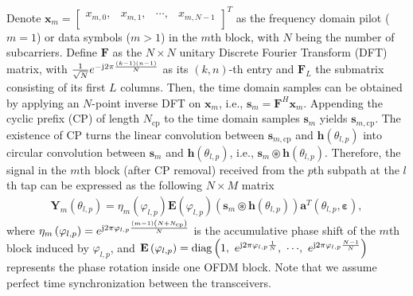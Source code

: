 \documentclass[12pt, draftclsnofoot, onecolumn]{IEEEtran}
\begin{document}
Denote ${{\mathbf{x}}_{m}} \!=\! {{\left[ \begin{matrix}
   {{x}_{m, 0}}, & {{x}_{m, 1}}, & \cdots\!,  & {{x}_{m, N-1}}  \\
\end{matrix} \right]}^{T}}$ as the frequency domain pilot ($m\!=\!1$) or data symbols ($m\!>\!1$) in the $m$th block, with $N$ being the number of subcarriers. Define $\mathbf{F}$ as the $N\!\times\! N$ unitary Discrete Fourier Transform (DFT) matrix, with $\frac{1}{\sqrt{N}}{{e}^{-\text{j}2{\rm\pi} \frac{\left( k-1 \right)\left( n-1 \right)}{N}}}$ as its $(k,n)$-th entry and ${{\mathbf{F}}_{L}}$ the submatrix consisting of its first $L$ columns. Then, the time domain samples can be obtained by applying an $N$-point inverse DFT on ${\mathbf{x}}_{m}$, i.e., ${{\mathbf{s}}_{m}} \!=\! {\mathbf{F}}^H {\mathbf{x}}_{m}$. Appending the cyclic prefix (CP) of length $N_{\mathrm{cp}}$ to the time domain samples ${{\mathbf{s}}_{m}}$ yields ${{\mathbf{s}}_{m, \mathrm{cp}}}$. The existence of CP turns the linear convolution between ${{\mathbf{s}}_{m, \mathrm{cp}}}$ and $\mathbf{h}\left( {{\theta }_{l,p}} \right)$ into circular convolution between ${{\mathbf{s}}_{m}}$ and $\mathbf{h}\left( {{\theta }_{l,p}} \right)$, i.e., $\mathbf{s}_m \circledast \mathbf{h}(\theta_{l,p})$.
Therefore, the signal in the $m$th block (after CP removal) received from the $p$th subpath at the $l$th tap can be expressed as the following $N\times M$ matrix
\begin{align}
{{\mathbf{Y}}_{m}(\theta_{l,p})} = {{{\eta }_{m}}\left( {{\varphi }_{l,p}} \right) \mathbf{E}\left( {{\varphi }_{l,p}} \right) \left(\mathbf{s}_m \circledast \mathbf{h}(\theta_{l,p})\right) {{\mathbf{a}}^{T}}\left( {{\theta }_{l, p}}, \boldsymbol{\varepsilon } \right)},
\end{align}
where ${{\eta }_{m}}\left( {{\varphi }_{l,p}} \right)={{e}^{\text{j}2{\rm\pi} {{\varphi }_{l,p}}\frac{\left( m-1 \right)\left( N+{{N}_{\mathrm{cp}}} \right)}{N}}}$ is the accumulative phase shift of the $m$th block induced by ${\varphi }_{l,p}$, and $\mathbf{E}\left( {{\varphi }_{l,p}} \right)=\operatorname{diag}\left( 1,\ {{e}^{\text{j}2{\rm\pi} {{\varphi }_{l,p}}\frac{1}{N}}},\ \cdots\!, \ {{e}^{\text{j}2{\rm\pi} {{\varphi }_{l,p}}\frac{N-1}{N}}} \right)$ represents the phase rotation inside one OFDM block. Note that we assume perfect time synchronization between the transceivers.
\end{document}
